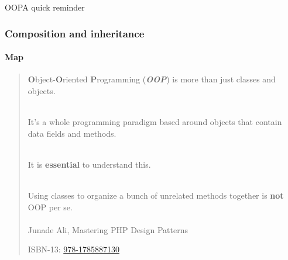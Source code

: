 \begin{sepframe}{OOP}{A quick reminder}
\end{sepframe}

\begin{frame}[fragile,c]
    \frametitle{Composition and inheritance}
    \framesubtitle{Map}

\end{frame}

\begin{frame}
    \begin{quote}
        \textbf{O}bject-\textbf{O}riented \textbf{P}rogramming (\textbf{\textit{OOP}}) is more than just classes and objects.\\~\\\pause

        It's a whole programming paradigm based around objects that contain data fields and methods.\\~\\

        \pause

        It is \textbf{essential} to understand this.\\~\\

        \pause

        Using classes to organize a bunch of unrelated methods together is \textbf{not} OOP per se.\\~\\

        \hfill Junade Ali, Mastering PHP Design Patterns

        \hfill ISBN-13: \href{https://www.amazon.com/Mastering-PHP-Design-Patterns-Junade/dp/1785887130}{978-1785887130}
    \end{quote}
\end{frame}

